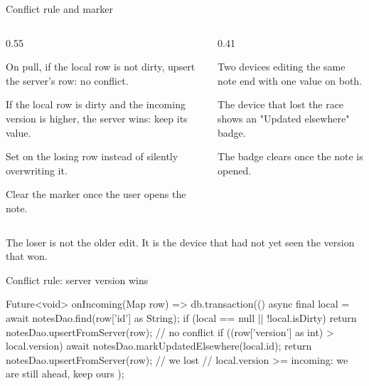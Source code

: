 \documentclass[10pt,aspectratio=169,t]{beamer}
\begin{document}
\begin{frame}[eyebrow=Task III]{Conflict rule and marker}
  \begin{columns}[T]
    \begin{column}{0.55\textwidth}
      \begin{steps}
        \item On pull, if the local row is not dirty, upsert the server's row: no conflict.
        \item If the local row is dirty and the incoming version is higher, the server wins: keep its value.
        \item Set  on the losing row instead of silently overwriting it.
        \item Clear the marker once the user opens the note.
      \end{steps}
    \end{column}
    \begin{column}{0.41\textwidth}
      \begin{checklist}
        \item Two devices editing the same note end with one value on both.
        \item The device that lost the race shows an "Updated elsewhere" badge.
        \item The badge clears once the note is opened.
      \end{checklist}
    \end{column}
  \end{columns}
  \begin{takeaway}{The loser is not the older edit.}
    It is the device that had not yet seen the version that won.
  \end{takeaway}
\end{frame}

\begin{frame}[fragile,eyebrow=Task III]{Conflict rule: server version wins}
  \vskip 1mm
\begin{dart}
Future<void> onIncoming(Map row) => db.transaction(() async {
  final local = await notesDao.find(row['id'] as String);
  if (local == null || !local.isDirty) {
    return notesDao.upsertFromServer(row);      // no conflict
  }
  if ((row['version'] as int) > local.version) {
    await notesDao.markUpdatedElsewhere(local.id);
    return notesDao.upsertFromServer(row);      // we lost
  }
  // local.version >= incoming: we are still ahead, keep ours
});
\end{dart}
\end{frame}
\end{document}
